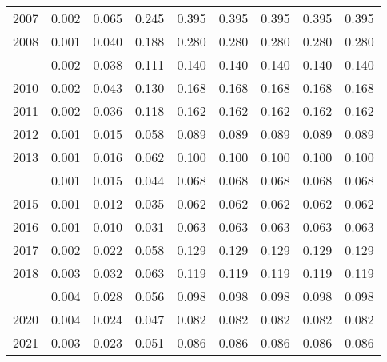 \documentclass[
]{article}
\begin{document}
\begin{longtable}[t]{lrrrrrrrr}
2007 & 0.002 & 0.065 & 0.245 & 0.395 & 0.395 & 0.395 & 0.395 & 0.395\\
2008 & 0.001 & 0.040 & 0.188 & 0.280 & 0.280 & 0.280 & 0.280 & 0.280\\
\addlinespace
2009 & 0.002 & 0.038 & 0.111 & 0.140 & 0.140 & 0.140 & 0.140 & 0.140\\
2010 & 0.002 & 0.043 & 0.130 & 0.168 & 0.168 & 0.168 & 0.168 & 0.168\\
2011 & 0.002 & 0.036 & 0.118 & 0.162 & 0.162 & 0.162 & 0.162 & 0.162\\
2012 & 0.001 & 0.015 & 0.058 & 0.089 & 0.089 & 0.089 & 0.089 & 0.089\\
2013 & 0.001 & 0.016 & 0.062 & 0.100 & 0.100 & 0.100 & 0.100 & 0.100\\
\addlinespace
2014 & 0.001 & 0.015 & 0.044 & 0.068 & 0.068 & 0.068 & 0.068 & 0.068\\
2015 & 0.001 & 0.012 & 0.035 & 0.062 & 0.062 & 0.062 & 0.062 & 0.062\\
2016 & 0.001 & 0.010 & 0.031 & 0.063 & 0.063 & 0.063 & 0.063 & 0.063\\
2017 & 0.002 & 0.022 & 0.058 & 0.129 & 0.129 & 0.129 & 0.129 & 0.129\\
2018 & 0.003 & 0.032 & 0.063 & 0.119 & 0.119 & 0.119 & 0.119 & 0.119\\
\addlinespace
2019 & 0.004 & 0.028 & 0.056 & 0.098 & 0.098 & 0.098 & 0.098 & 0.098\\
2020 & 0.004 & 0.024 & 0.047 & 0.082 & 0.082 & 0.082 & 0.082 & 0.082\\
2021 & 0.003 & 0.023 & 0.051 & 0.086 & 0.086 & 0.086 & 0.086 & 0.086\\*
\end{longtable}
\end{document}
